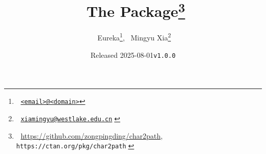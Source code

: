 \documentclass[lm-default]{l3doc}
\title{^^A
  The \pkg{char2path} Package\thanks{^^A
    \url{https://github.com/zongpingding/char2path},
    \texttt{https://ctan.org/pkg/char2path}^^A
  }^^A
}
\author{^^A
  Eureka\thanks{^^A
    \href{mailto:<email>@<domain>}{\texttt{<email>@<domain>}}},~
  Mingyu Xia\thanks{^^A
    \href{mailto:xiamingyu@westlake.edu.cn}{\texttt{xiamingyu@westlake.edu.cn}}^^A
  }^^A
}
\date{Released 2025-08-01\quad \texttt{v1.0.0}}
\begin{document}
\maketitle

\begin{documentation}









\end{documentation}
\end{document}
